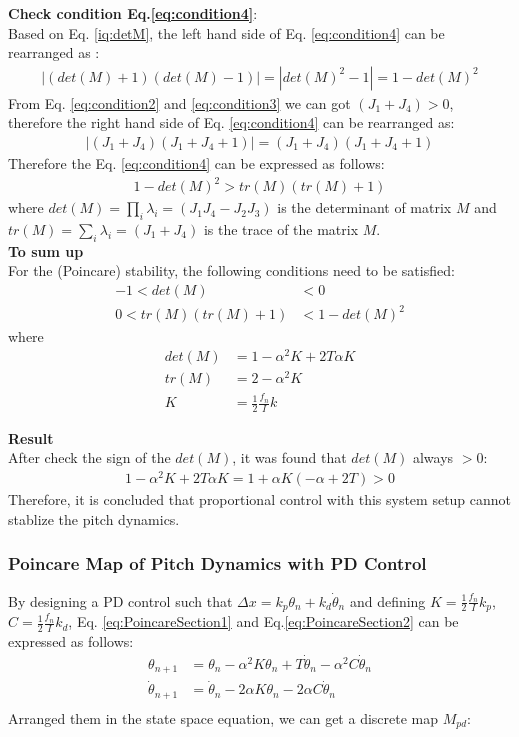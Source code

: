 \noindent \textbf{Check condition Eq.\ref{eq:condition4}}:\\
Based on Eq. \ref{iq:detM}, the left hand side of Eq. \ref{eq:condition4} can be rearranged as :
\begin{align*}
|(det(M)+1)(det(M)-1)| = |det(M)^2-1| = 1-det(M)^2
\end{align*}
From Eq. \ref{eq:condition2} and \ref{eq:condition3} we can got $(J_1+J_4)>0$, therefore the right hand side of Eq. \ref{eq:condition4} can be rearranged as:
\begin{align*}
|(J_1+J_4)(J_1+J_4 +1)| = (J_1+J_4)(J_1+J_4 +1)
\end{align*}
Therefore the Eq. \ref{eq:condition4} can be expressed as follows:
\begin{align*}
1-det(M)^2> tr(M) ( tr(M) + 1)
\end{align*}
where $det(M) = \prod\limits_{i}^{}\lambda_i = (J_1J_4-J_2J_3)$ is the determinant of matrix $M$ and $tr(M)=\sum\limits_{i}^{}\lambda_i = (J_1 + J_4)$ is the trace of the matrix $M$.\\

\noindent \textbf{To sum up}\\
For the (Poincare) stability, the following conditions need to be satisfied:
\begin{align}
-1<det(M)&<0\\
0< tr(M) ( tr(M) + 1)&<1-det(M)^2
\end{align}
where
\begin{align*}
det(M) &= 1- \alpha^2K + 2T\alpha K\\
tr(M) &= 2- \alpha^2K \\
K &= \frac{1}{2}\frac{f_n}{I}k
\end{align*}

\noindent \textbf{Result}\\
After check the sign of the $det(M)$, it was found that $det(M)$ always $>0$:
\begin{align*}
 1-\alpha^2K+2T\alpha K = 1 + \alpha K(-\alpha+2T)>0
\end{align*}
Therefore, it is concluded that proportional control with this system setup cannot stablize the pitch dynamics.
\pagebreak

\subsubsection{Poincare Map of Pitch Dynamics with PD Control}
By designing a PD control such that $\Delta x = k_p\theta_n+k_d\dot \theta_n$ and defining $K =\frac{1}{2} \frac{f_n}{I}k_p$, $C =\frac{1}{2} \frac{f_n}{I}k_d$, Eq. \ref{eq:PoincareSection1} and Eq.\ref{eq:PoincareSection2} can be expressed as follows:
\begin{align*}
\theta_{n+1} &= \theta_n  - \alpha^2 K \theta_n + T\dot \theta_n - \alpha^2 C \dot\theta_n\\
\dot \theta_{n+1} &= \dot \theta_n  - 2\alpha K \theta_n- 2\alpha C \dot\theta_n\\
\end{align*}
Arranged them in the state space equation, we can get a discrete map $M_{pd}$:

